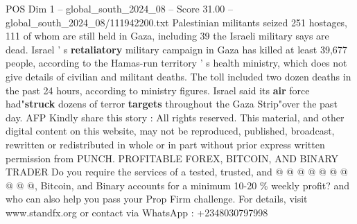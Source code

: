 \begin{textsample}{POS Dim 1 – global\_south\_2024\_08 – Score 31.00 – global\_south\_2024\_08/111942200.txt}
Palestinian militants seized 251 hostages, 111 of whom are still held in Gaza, including 39 the Israeli military says are dead.
Israel ' s \textbf{retaliatory} military campaign in Gaza has killed at least 39,677 people, according to the Hamas-run territory ' s health ministry, which does not give details of civilian and militant deaths.
The toll included two dozen deaths in the past 24 hours, according to ministry figures.
Israel said its \textbf{air} force had"\textbf{struck} dozens of terror \textbf{targets} throughout the Gaza Strip"over the past day.
AFP Kindly share this story : All rights reserved.
This material, and other digital content on this website, may not be reproduced, published, broadcast, rewritten or redistributed in whole or in part without prior express written permission from PUNCH.
PROFITABLE FOREX, BITCOIN, AND BINARY TRADER Do you require the services of a tested, trusted, and @ @ @ @ @ @ @ @ @ @, Bitcoin, and Binary accounts for a minimum 10-20 \% weekly profit? and who can also help you pass your Prop Firm challenge.
For details, visit www.standfx.org or contact via WhatsApp : +2348030797998

\end{textsample}
